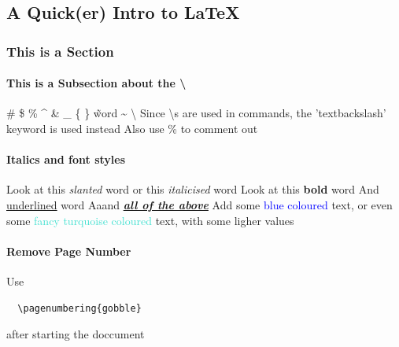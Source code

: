 \documentclass[12pt,twoside,a4paper]{article}
\begin{document}
\begin{center}
  \part*{A Quick(er) Intro to \LaTeX} %
\end{center}

\section*{This is a Section}

\subsection*{This is a Subsection about the \textbackslash}

\# \$ \% \^{} \& \_ \{ \} \~word \~{} \textbackslash
\newline \newline Since \textbackslash s are used in commands, the 'textbackslash' keyword is used instead
\newline Also use \% to comment out %

\subsection*{Italics and font styles}
Look at this \textsl{slanted} word
\newline or this \textit{italicised} word %
\newline Look at this \textbf{bold} word \newline And \underline{underlined} word
\newline Aaand \textbf{\textit{\underline{all of the above}}}
\newline \newline Add some \textcolor{blue}{blue coloured} text, or even some
\textcolor{Turquoise}{fancy turquoise coloured} text, with some
\textcolor{TurquoiseLighter2}{ligher values}

\subsection*{Remove Page Number}
Use \begin{verbatim}
  \pagenumbering{gobble}
\end{verbatim} after starting the doccument
\end{document}
